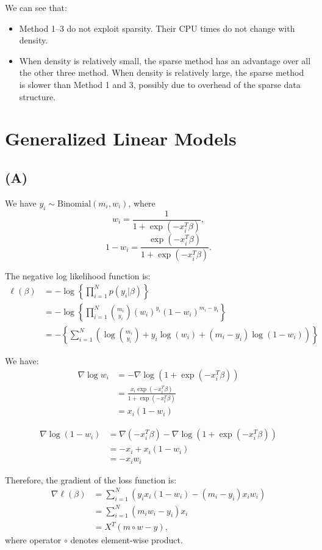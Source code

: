 \documentclass[a4paper,11pt]{article}
\begin{document}
We can see that:
\begin{itemize}
	\item Method 1--3 do not exploit sparsity. Their CPU times do not change with density.
	\item When density is relatively small, the sparse method has an advantage over all the other three method. When density is relatively large, the sparse method is slower than Method 1 and 3, possibly due to overhead of the sparse data structure.
\end{itemize} 

\section{Generalized Linear Models}

\subsection{(A)}
We have $y_i \sim \text{Binomial}(m_i, w_i)$, where 
$$
		w_i = \frac{1}{1+\exp(-x_i^T\beta)},
$$
$$
1-w_i = \frac{\exp(-x_i^T\beta)}{1+\exp(-x_i^T\beta)}.
$$

The negative log likelihood function is:
\begin{align}
		\ell(\beta) &= -\log \left \{ \prod_{i=1}^N p(y_i | \beta)  \right \} \\
		&= -\log \left \{ \prod_{i=1}^N \binom {m_i}{y_i}(w_i)^{y_i}(1-w_i)^{m_i-y_i}  \right \} \\
		&= - \left \{ \sum_{i=1}^{N} \left ( \log\binom {m_i}{y_i} + y_i \log(w_i) + (m_i-y_i)\log(1-w_i) \right ) \right \} 
	\end{align}
	
We have:
\begin{align}
\nabla \log w_i& = - \nabla \log (1 + \exp(-x_i^T\beta)	)\\
&= \frac{x_i \exp(-x_i^T\beta)}{1 + \exp(-x_i^T\beta)}\\
& = x_i(1-w_i)
\end{align}

\begin{align}
\nabla \log (1-w_i) & = \nabla (-x_i^T\beta)- \nabla \log (1 + \exp(-x_i^T\beta)	)\\
&= -x_i + x_i (1 - w_i)\\
& = -x_iw_i
\end{align}



Therefore, the gradient of the loss function is:
\begin{align}
		\nabla \ell (\beta) &=\sum_{i=1}^N \left ( y_i x_i (1-w_i) - (m_i - y_i) x_i w_i \right ) \\
		&= \sum_{i=1}^N (m_iw_i-y_i)x_i \\
		&= X^T(m\circ w-y),
	\end{align}
where operator $\circ$ denotes element-wise product.
\end{document}
